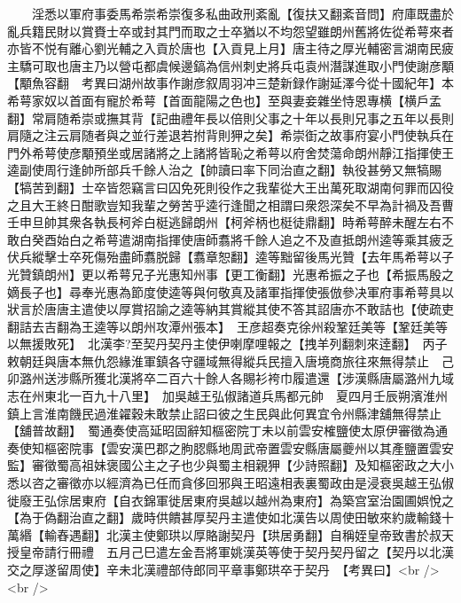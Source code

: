　　淫悉以軍府事委馬希崇希崇復多私曲政刑紊亂【復扶又翻紊音問】府庫既盡於亂兵籍民財以賞賚士卒或封其門而取之士卒猶以不均怨望雖朗州舊將佐從希萼來者亦皆不悦有離心劉光輔之入貢於唐也【入貢見上月】唐主待之厚光輔密言湖南民疲主驕可取也唐主乃以營屯都虞候邊鎬為信州刺史將兵屯袁州潛謀進取小門使謝彦顒【顒魚容翻　考異曰湖州故事作謝彦叙周羽冲三楚新録作謝延澤今從十國紀年】本希萼家奴以首面有寵於希萼【首面龍陽之色也】至與妻妾雜坐恃恩專横【横戶孟翻】常肩随希崇或撫其背【記曲禮年長以倍則父事之十年以長則兄事之五年以長則肩隨之注云肩随者與之並行差退若拊背則狎之矣】希崇衘之故事府宴小門使執兵在門外希萼使彦顒預坐或居諸將之上諸將皆恥之希萼以府舍焚蕩命朗州靜江指揮使王逵副使周行逢帥所部兵千餘人治之【帥讀曰率下同治直之翻】執役甚勞又無犒賜【犒苦到翻】士卒皆怨竊言曰囚免死則役作之我輩從大王出萬死取湖南何罪而囚役之且大王終日酣歌豈知我輩之勞苦乎逵行逢聞之相謂曰衆怨深矣不早為計禍及吾曹壬申旦帥其衆各執長柯斧白梃逃歸朗州【柯斧柄也梃徒鼎翻】時希萼醉未醒左右不敢白癸酉始白之希萼遣湖南指揮使唐師翥將千餘人追之不及直抵朗州逵等乘其疲乏伏兵縱擊士卒死傷殆盡師翥脱歸【翥章恕翻】逵等黜留後馬光贊【去年馬希萼以子光贊鎮朗州】更以希萼兄子光惠知州事【更工衡翻】光惠希振之子也【希振馬殷之嫡長子也】尋奉光惠為節度使逵等與何敬真及諸軍指揮使張倣參决軍府事希萼具以狀言於唐唐主遣使以厚賞招諭之逵等納其賞縱其使不答其詔唐亦不敢詰也【使疏吏翻詰去吉翻為王逵等以朗州攻潭州張本】　王彦超奏克徐州殺鞏廷美等【鞏廷美等以無援敗死】　北漢李?至契丹契丹主使伊喇摩哩報之【拽羊列翻刺來逹翻】　丙子敕朝廷與唐本無仇怨緣淮軍鎮各守疆域無得縱兵民擅入唐境商旅往來無得禁止　己卯潞州送涉縣所獲北漢將卒二百六十餘人各賜衫袴巾履遣還【涉漢縣唐屬潞州九域志在州東北一百九十八里】　加吳越王弘俶諸道兵馬都元帥　夏四月壬辰朔濱淮州鎮上言淮南饑民過淮糴穀未敢禁止詔曰彼之生民與此何異宜令州縣津舖無得禁止【舖普故翻】　蜀通奏使高延昭固辭知樞密院丁未以前雲安榷鹽使太原伊審徵為通奏使知樞密院事【雲安漢巴郡之朐䏰縣地周武帝置雲安縣唐屬夔州以其產鹽置雲安監】審徵蜀高祖妹褒國公主之子也少與蜀主相親狎【少詩照翻】及知樞密政之大小悉以咨之審徵亦以經濟為已任而貪侈回邪與王昭遠相表裏蜀政由是浸衰吳越王弘俶徙廢王弘倧居東府【自衣錦軍徙居東府吳越以越州為東府】為築宫室治園圃娯悅之【為于偽翻治直之翻】歲時供饋甚厚契丹主遣使如北漢告以周使田敏來約歲輸錢十萬緡【輸舂遇翻】北漢主使鄭珙以厚賂謝契丹【珙居勇翻】自稱姪皇帝致書於叔天授皇帝請行冊禮　五月己巳遣左金吾將軍姚漢英等使于契丹契丹留之【契丹以北漢交之厚遂留周使】辛未北漢禮部侍郎同平章事鄭珙卒于契丹　【考異曰】<br />
<br />
